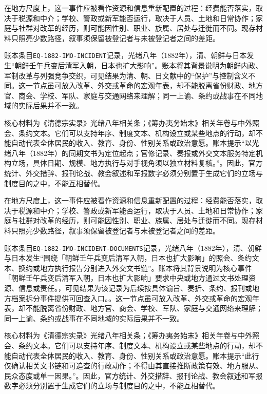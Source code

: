 在地方尺度上，这一事件应被看作资源和信息重新配置的过程：经费能否落实，取决于税源和中介；学校、警政或新军能否运行，取决于人员、土地和日常协作；家庭与社群对改革的经历，则可能因性别、职业、族属、居处与迁徙而不同。现存材料只照亮少数路径，叙事须保留被登记者与未被登记者之间的差距。

账本条目\texttt{EQ-1882-IMO-INCIDENT}记录，光绪八年（1882年），清、朝鲜与日本发生“朝鲜壬午兵变后清军入朝，日本也扩大影响”。账本将其背景说明为朝鲜内政、军制改革与列强竞争交织，可见结果为清、朝、日文献中的“保护”与控制含义不同。这一节点虽可放入改革、外交或革命的宏观年表，却不能脱离省份财政、地方官、商会、学校、军队、家庭与交通网络来理解；同一上谕、条约或战事在不同地域的实际后果并不一致。

核心材料为《清德宗实录》光绪八年相关条；《筹办夷务始末》相关年卷与中外照会、条约文本。它们可以支持年序、制度文本、机构设立或某些地点的行动，却不能自动代表全体居民的收入、教育、身份、性别关系或政治意愿。账本提示“以光绪八年（1882年）的同期文书为定位起点；官修记录、奏报或外交文本服务特定机构立场，具体日期、规模、地方执行与对手视角须以独立材料复核。”。因此，官方统计、外交措辞、报刊论战、教会叙述和军报数字必须分别置于生成它们的立场与制度目的之中，不能互相替代。

在地方尺度上，这一事件应被看作资源和信息重新配置的过程：经费能否落实，取决于税源和中介；学校、警政或新军能否运行，取决于人员、土地和日常协作；家庭与社群对改革的经历，则可能因性别、职业、族属、居处与迁徙而不同。现存材料只照亮少数路径，叙事须保留被登记者与未被登记者之间的差距。

账本条目\texttt{EQ-1882-IMO-INCIDENT-DOCUMENTS}记录，光绪八年（1882年），清、朝鲜与日本发生“围绕「朝鲜壬午兵变后清军入朝，日本也扩大影响」的照会、条约文本、换约或地方执行报告分别进入外交文书链”。账本将其背景说明为核心事件「朝鲜壬午兵变后清军入朝，日本也扩大影响」要求中央或地方通过文书处理资源、信息或责任。，可见结果为该记录为后续按具体谕旨、奏折、条约、报刊或地方档案拆分事件提供可回查入口。。这一节点虽可放入改革、外交或革命的宏观年表，却不能脱离省份财政、地方官、商会、学校、军队、家庭与交通网络来理解；同一上谕、条约或战事在不同地域的实际后果并不一致。

核心材料为《清德宗实录》光绪八年相关条；《筹办夷务始末》相关年卷与中外照会、条约文本。它们可以支持年序、制度文本、机构设立或某些地点的行动，却不能自动代表全体居民的收入、教育、身份、性别关系或政治意愿。账本提示“此行仅确认相关文书链和可追查的行政动作；不得由其直接推断政策有效、地方服从、民众态度或单一因果。”。因此，官方统计、外交措辞、报刊论战、教会叙述和军报数字必须分别置于生成它们的立场与制度目的之中，不能互相替代。

